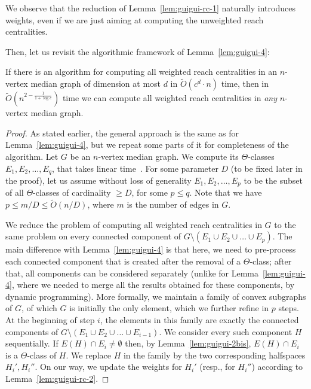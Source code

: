 We observe that the reduction of Lemma~\ref{lem:guigui-rc-1} naturally introduces weights, even if we are just aiming at computing the unweighted reach centralities.

Then, let us revisit the algorithmic framework of Lemma~\ref{lem:guigui-4}:

\begin{lemma}\label{lem:guigui-rc-2}
If there is an algorithm for computing all weighted reach centralities in an $n$-vertex median graph of dimension at most $d$ in $\tilde{O}(c^d \cdot n)$ time, then in $\tilde{O}(n^{2 - \frac 1 {1+\log{c}}})$ time we can compute all weighted reach centralities in {\em any} $n$-vertex median graph.
\end{lemma}

\begin{proof}
As stated earlier, the general approach is the same as for Lemma~\ref{lem:guigui-4}, but we repeat some parts of it for completeness of the algorithm.
Let $G$ be an $n$-vertex median graph.
We compute its $\Theta$-classes $E_1,E_2,\ldots,E_q$, that takes linear time~\cite{BeChChVa20}.
For some parameter $D$ (to be fixed later in the proof), let us assume without loss of generality $E_1,E_2,\ldots,E_p$ to be the subset of all $\Theta$-classes of cardinality $\geq D$, for some $p \leq q$. Note that we have $p \leq m/D \leq \tilde{O}(n/D)$, where $m$ is the number of edges in $G$.

We reduce the problem of computing all weighted reach centralities in $G$ to the same problem on every connected component of $G \setminus (E_1 \cup E_2 \cup \ldots \cup E_p)$. 
The main difference with Lemma~\ref{lem:guigui-4} is that here, we need to pre-process each connected component that is created after the removal of a $\Theta$-class; after that, all components can be considered separately (unlike for Lemma~\ref{lem:guigui-4}, where we needed to merge all the results obtained for these components, by dynamic programming).
More formally, we maintain a family of convex subgraphs of $G$, of which $G$ is initially the only element, which we further refine in $p$ steps.
At the beginning of step $i$, the elements in this family are exactly the connected components of $G \setminus \left(E_1 \cup E_2 \cup \ldots \cup E_{i-1}\right)$.
We consider every such component $H$ sequentially.
If $E(H) \cap E_i \neq \emptyset$ then, by Lemma~\ref{lem:guigui-2bis}, $E(H) \cap E_i$ is a $\Theta$-class of $H$.
We replace $H$ in the family by the two corresponding halfspaces $H_i',H_i''$.  
On our way, we update the weights for $H_i'$ (resp., for $H_i''$) according to Lemma~\ref{lem:guigui-rc-2}.


\end{proof}
